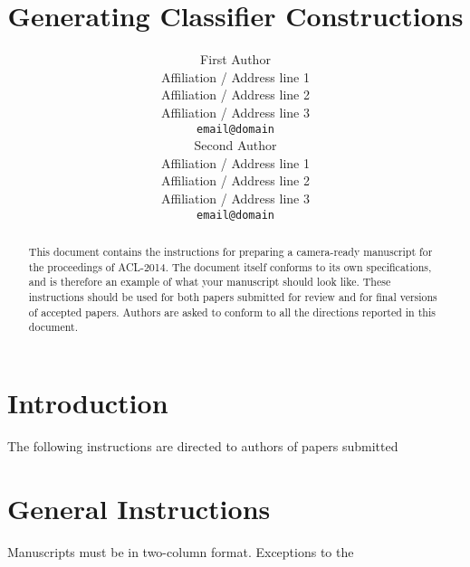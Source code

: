 \documentclass[11pt]{article}
\title{Generating Classifier Constructions}
\author{First Author \\
  Affiliation / Address line 1 \\
  Affiliation / Address line 2 \\
  Affiliation / Address line 3 \\
  {\tt email@domain} \\\And
  Second Author \\
  Affiliation / Address line 1 \\
  Affiliation / Address line 2 \\
  Affiliation / Address line 3 \\
  {\tt email@domain} \\}
\date{}
\begin{document}
\maketitle
\begin{abstract}
  This document contains the instructions for preparing a camera-ready
  manuscript for the proceedings of ACL-2014. The document itself
  conforms to its own specifications, and is therefore an example of
  what your manuscript should look like. These instructions should be
  used for both papers submitted for review and for final versions of
  accepted papers.  Authors are asked to conform to all the directions
  reported in this document.
\end{abstract}

\section{Introduction}

The following instructions are directed to authors of papers submitted

\section{General Instructions}

Manuscripts must be in two-column format.  Exceptions to the
\cite{bond:etal:11}







\end{document}
